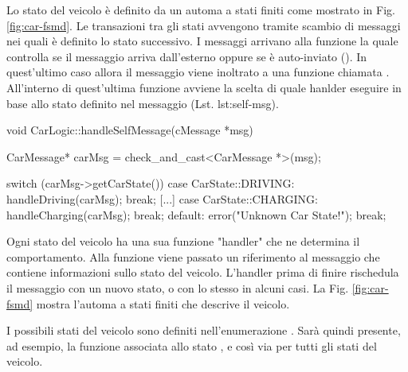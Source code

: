 Lo stato del veicolo è definito da un automa a stati finiti come mostrato in Fig. \ref{fig:car-fsmd}. Le transazioni tra gli stati avvengono tramite scambio di messaggi nei quali è definito lo stato successivo. I messaggi arrivano alla funzione  la quale controlla se il messaggio arriva dall'esterno oppure se è auto-inviato (). In quest'ultimo caso allora il messaggio viene inoltrato a una funzione chiamata . All'interno di quest'ultima funzione avviene la scelta di quale hanlder eseguire in base allo stato definito nel messaggio (Lst. lst:self-msg).

\begin{cpp}[caption={Funzione di scelta dello stato}, label={lst:self-msg}]
void CarLogic::handleSelfMessage(cMessage *msg) {
	CarMessage* carMsg = check_and_cast<CarMessage *>(msg);
	
	switch (carMsg->getCarState()) {
		case CarState::DRIVING:
			handleDriving(carMsg);
			break;
		[...]
		case CarState::CHARGING:
			handleCharging(carMsg);
			break;
		default:
			error("Unknown Car State!");
			break;
	}	
}
\end{cpp}

Ogni stato del veicolo ha una sua funzione "handler" che ne determina il comportamento. Alla funzione viene passato un riferimento al messaggio che contiene informazioni sullo stato del veicolo. L'handler prima di finire rischedula il messaggio con un nuovo stato, o con lo stesso in alcuni casi. La Fig. \ref{fig:car-fsmd} mostra l'automa a stati finiti che descrive il veicolo. 

I possibili stati del veicolo sono definiti nell'enumerazione . Sarà quindi presente, ad esempio, la funzione  associata allo stato , e così via per tutti gli stati del veicolo.

